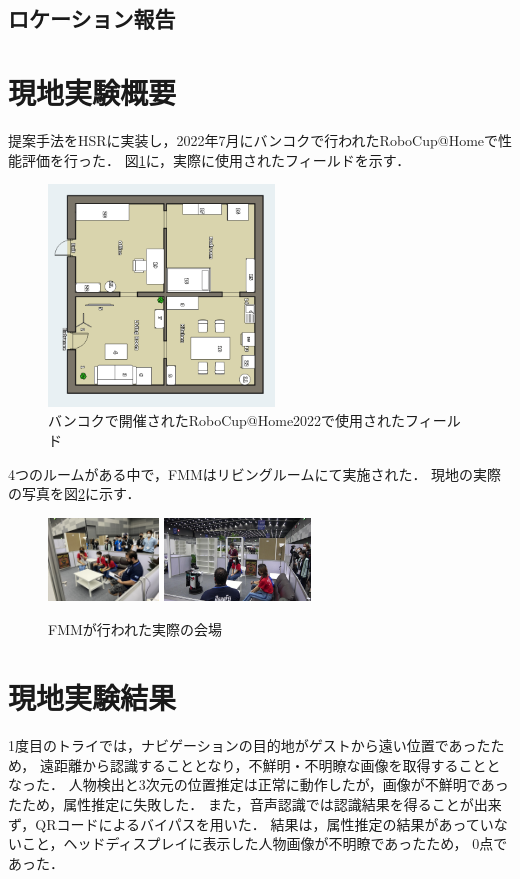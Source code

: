 \documentclass[a4j]{jarticle}
\begin{document}
\subsection{ロケーション報告}


\section{現地実験概要}
提案手法をHSRに実装し，2022年7月にバンコクで行われたRoboCup@Homeで性能評価を行った．
図\ref{robocup_field}に，実際に使用されたフィールドを示す．
\begin{figure}[ht]
  \centering
  \includegraphics[width=6cm]{images/robocup/arenaBangkok_rotate.png}
  \caption{バンコクで開催されたRoboCup@Home2022で使用されたフィールド}
  \label{robocup_field}
\end{figure}
4つのルームがある中で，FMMはリビングルームにて実施された．
現地の実際の写真を図\ref{onsite_overview_1}に示す．
\begin{figure}[ht]
  \centering
  \includegraphics[height=2.2cm]{images/robocup/FMM_onsite_overview_1.jpg}
  \includegraphics[height=2.2cm]{images/robocup/FMM_onsite_overview_3.jpg}
  \caption{FMMが行われた実際の会場}
  \label{onsite_overview_1}
\end{figure}


\section{現地実験結果}
1度目のトライでは，ナビゲーションの目的地がゲストから遠い位置であったため，
遠距離から認識することとなり，不鮮明・不明瞭な画像を取得することとなった．
人物検出と3次元の位置推定は正常に動作したが，画像が不鮮明であったため，属性推定に失敗した．
また，音声認識では認識結果を得ることが出来ず，QRコードによるバイパスを用いた．
結果は，属性推定の結果があっていないこと，ヘッドディスプレイに表示した人物画像が不明瞭であったため，
0点であった．
\end{document}
